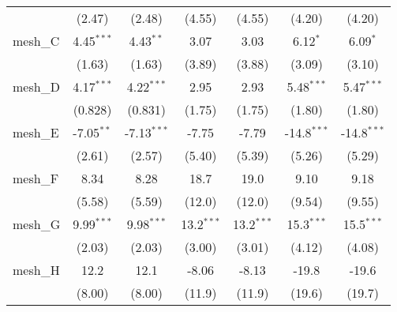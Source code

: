\begin{tabular}{lcccccc}
                                                               & (2.47)         & (2.48)        & (4.55)         & (4.55)         & (4.20)        & (4.20)\\   
   mesh\_C                                                     & 4.45$^{***}$   & 4.43$^{**}$   & 3.07           & 3.03           & 6.12$^{*}$    & 6.09$^{*}$\\   
                                                               & (1.63)         & (1.63)        & (3.89)         & (3.88)         & (3.09)        & (3.10)\\   
   mesh\_D                                                     & 4.17$^{***}$   & 4.22$^{***}$  & 2.95           & 2.93           & 5.48$^{***}$  & 5.47$^{***}$\\   
                                                               & (0.828)        & (0.831)       & (1.75)         & (1.75)         & (1.80)        & (1.80)\\   
   mesh\_E                                                     & -7.05$^{**}$   & -7.13$^{***}$ & -7.75          & -7.79          & -14.8$^{***}$ & -14.8$^{***}$\\   
                                                               & (2.61)         & (2.57)        & (5.40)         & (5.39)         & (5.26)        & (5.29)\\   
   mesh\_F                                                     & 8.34           & 8.28          & 18.7           & 19.0           & 9.10          & 9.18\\   
                                                               & (5.58)         & (5.59)        & (12.0)         & (12.0)         & (9.54)        & (9.55)\\   
   mesh\_G                                                     & 9.99$^{***}$   & 9.98$^{***}$  & 13.2$^{***}$   & 13.2$^{***}$   & 15.3$^{***}$  & 15.5$^{***}$\\   
                                                               & (2.03)         & (2.03)        & (3.00)         & (3.01)         & (4.12)        & (4.08)\\   
   mesh\_H                                                     & 12.2           & 12.1          & -8.06          & -8.13          & -19.8         & -19.6\\   
                                                               & (8.00)         & (8.00)        & (11.9)         & (11.9)         & (19.6)        & (19.7)\\   

\end{tabular}
